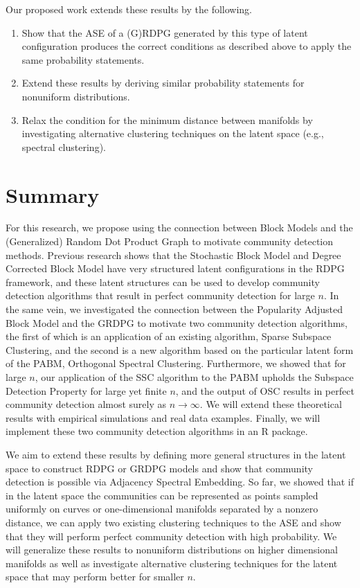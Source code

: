 \documentclass[
  11pt,
]{article}
\providecommand{\tightlist}{%
  \setlength{\itemsep}{0pt}\setlength{\parskip}{0pt}}
\begin{document}
Our proposed work extends these results by the following.

\begin{enumerate}
\def\labelenumi{\arabic{enumi}.}
\tightlist
\item
  Show that the ASE of a (G)RDPG generated by this type of latent
  configuration produces the correct conditions as described above to
  apply the same probability statements.
\item
  Extend these results by deriving similar probability statements for
  nonuniform distributions.
\item
  Relax the condition for the minimum distance between manifolds by
  investigating alternative clustering techniques on the latent space
  (e.g., spectral clustering).
\end{enumerate}

\hypertarget{summary}{%
\section{Summary}\label{summary}}

For this research, we propose using the connection between Block Models
and the (Generalized) Random Dot Product Graph to motivate community
detection methods. Previous research shows that the Stochastic Block
Model and Degree Corrected Block Model have very structured latent
configurations in the RDPG framework, and these latent structures can be
used to develop community detection algorithms that result in perfect
community detection for large \(n\). In the same vein, we investigated
the connection between the Popularity Adjusted Block Model and the GRDPG
to motivate two community detection algorithms, the first of which is an
application of an existing algorithm, Sparse Subspace Clustering, and
the second is a new algorithm based on the particular latent form of the
PABM, Orthogonal Spectral Clustering. Furthermore, we showed that for
large \(n\), our application of the SSC algorithm to the PABM upholds
the Subspace Detection Property for large yet finite \(n\), and the
output of OSC results in perfect community detection almost surely as
\(n \to \infty\). We will extend these theoretical results with
empirical simulations and real data examples. Finally, we will implement
these two community detection algorithms in an R package.

We aim to extend these results by defining more general structures in
the latent space to construct RDPG or GRDPG models and show that
community detection is possible via Adjacency Spectral Embedding. So
far, we showed that if in the latent space the communities can be
represented as points sampled uniformly on curves or one-dimensional
manifolds separated by a nonzero distance, we can apply two existing
clustering techniques to the ASE and show that they will perform perfect
community detection with high probability. We will generalize these
results to nonuniform distributions on higher dimensional manifolds as
well as investigate alternative clustering techniques for the latent
space that may perform better for smaller \(n\).
\end{document}

